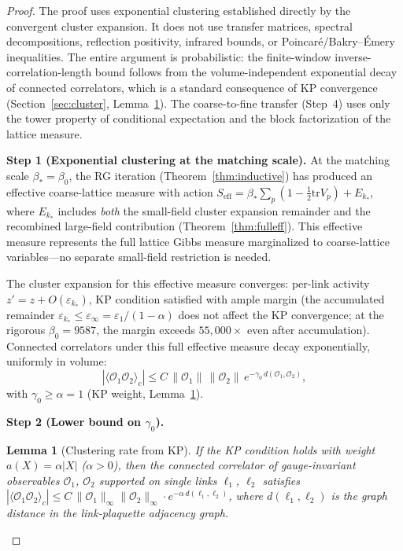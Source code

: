 \documentclass[11pt]{article}
\newtheorem{lemma}[theorem]{Lemma}
\theoremstyle{definition}
\newcommand{\tr}{\mathrm{tr}}
\begin{document}
\begin{proof}
The proof uses exponential clustering established directly
by the convergent cluster expansion.  It does
not use transfer matrices, spectral decompositions,
reflection positivity, infrared bounds, or Poincar\'e/Bakry--\'Emery
inequalities.  The entire argument
is probabilistic: the finite-window inverse-correlation-length bound
follows from the volume-independent exponential decay of connected
correlators, which is a standard consequence of KP convergence
(Section~\ref{sec:cluster}, Lemma~\ref{lem:cluster-rate}).
The coarse-to-fine transfer
(Step~4) uses only the tower property of conditional expectation
and the block factorization of the lattice measure.

\medskip\noindent\textbf{Step 1 (Exponential clustering at the
matching scale).}
At the matching scale $\beta_*=\beta_0$, the RG iteration
(Theorem~\ref{thm:inductive}) has produced an effective
coarse-lattice measure with action
$S_{\mathrm{eff}}=\beta_*\sum_p(1-\frac{1}{2}\tr V_p)+E_{k_*}$,
where $E_{k_*}$ includes \emph{both} the small-field cluster
expansion remainder and the recombined large-field contribution
(Theorem~\ref{thm:fulleff}).  This effective measure represents
the full lattice Gibbs measure marginalized to
coarse-lattice variables---no separate small-field restriction
is needed.

The cluster expansion for this effective measure converges:
per-link activity $z'=z+O(\varepsilon_{k_*})$,
KP condition satisfied with ample margin
(the accumulated remainder $\varepsilon_{k_*}\le\varepsilon_\infty
=\varepsilon_1/(1-\alpha)$ does not affect the KP convergence;
at the rigorous $\beta_0=9587$, the margin exceeds $55{,}000\times$
even after accumulation).
Connected correlators under this full effective measure decay
exponentially, uniformly in volume:
\begin{equation}\label{eq:cluster-decay}
|\langle\mathcal{O}_1\mathcal{O}_2\rangle_c|
\le C\,\|\mathcal{O}_1\|\,\|\mathcal{O}_2\|\,
e^{-\gamma_0\,d(\mathcal{O}_1,\mathcal{O}_2)},
\end{equation}
with $\gamma_0\ge\alpha=1$ (KP weight,
Lemma~\ref{lem:cluster-rate}).

\medskip\noindent\textbf{Step 2 (Lower bound on $\gamma_0$).}

\begin{lemma}[Clustering rate from KP]\label{lem:cluster-rate}
If the KP condition holds with weight $a(X)=\alpha|X|$
($\alpha>0$), then the connected correlator of gauge-invariant
observables $\mathcal{O}_1$, $\mathcal{O}_2$ supported on
single links $\ell_1$, $\ell_2$ satisfies
$|\langle\mathcal{O}_1\mathcal{O}_2\rangle_c|
\le C\,\|\mathcal{O}_1\|_\infty\|\mathcal{O}_2\|_\infty
\cdot e^{-\alpha\,d(\ell_1,\ell_2)}$,
where $d(\ell_1,\ell_2)$ is the graph distance in the
link-plaquette adjacency graph.
\end{lemma}


\end{proof}
\end{document}
